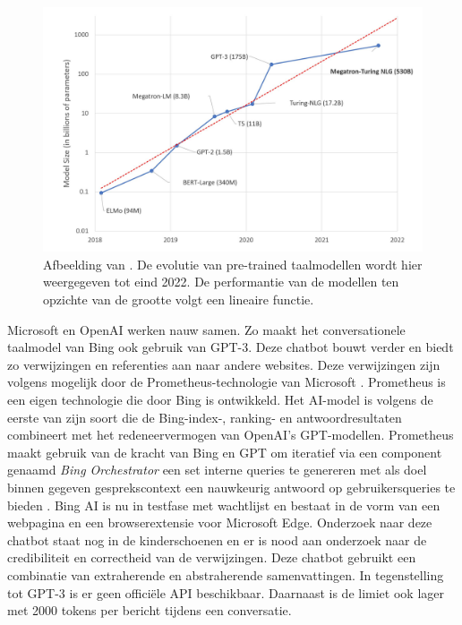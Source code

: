 \begin{figure}[H]
	\includegraphics{img/graph-language-models.png}
	\caption{Afbeelding van \textcite{Simon2021}. De evolutie van pre-trained taalmodellen wordt hier weergegeven tot eind 2022. De performantie van de modellen ten opzichte van de grootte volgt een lineaire functie.}
\end{figure}

\medspace

Microsoft en OpenAI werken nauw samen. Zo maakt het conversationele taalmodel van Bing ook gebruik van GPT-3. Deze chatbot bouwt verder en biedt zo verwijzingen en referenties aan naar andere websites. Deze verwijzingen zijn volgens mogelijk door de Prometheus-technologie van Microsoft \autocite{Ribas2023}. Prometheus is een eigen technologie die door Bing is ontwikkeld. Het AI-model is volgens \textcite{Ribas2023} de eerste van zijn soort die de Bing-index-, ranking- en antwoordresultaten combineert met het redeneervermogen van OpenAI’s GPT-modellen. Prometheus maakt gebruik van de kracht van Bing en GPT om iteratief via een component genaamd \textit{Bing Orchestrator} een set interne queries te genereren met als doel binnen gegeven gesprekscontext een nauwkeurig antwoord op gebruikersqueries te bieden \autocite{Ribas2023}. Bing AI is nu in testfase met wachtlijst en bestaat in de vorm van een webpagina en een browserextensie voor Microsoft Edge. Onderzoek naar deze chatbot staat nog in de kinderschoenen en er is nood aan onderzoek naar de credibiliteit en correctheid van de verwijzingen. Deze chatbot gebruikt een combinatie van extraherende en abstraherende samenvattingen. In tegenstelling tot GPT-3 is er geen officiële API beschikbaar. Daarnaast is de limiet ook lager met 2000 tokens per bericht tijdens een conversatie. 

